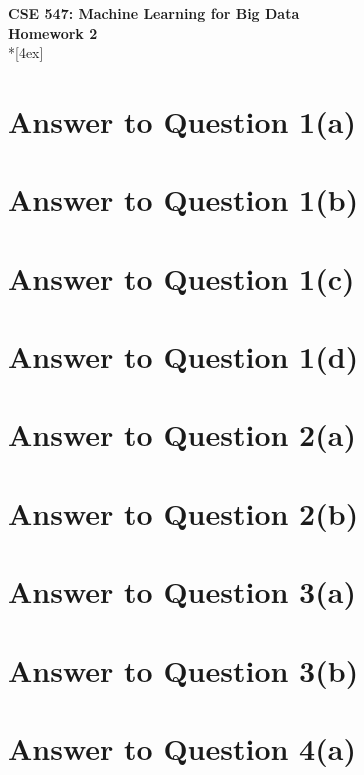 \documentclass[11pt]{article}
\begin{document}
\thispagestyle{empty}
\parindent 0pt
\vfill
\large

\begin{center}
\LARGE{\bf \textsf{CSE 547: Machine Learning for Big Data}}\\ {\bf \textsf{Homework 2}} 
\\*[4ex]
\end{center}

\section*{Answer to Question 1(a)}

\pagebreak[4]
\section*{Answer to Question 1(b)}

\pagebreak[4]
\section*{Answer to Question 1(c)}

\pagebreak[4]
\section*{Answer to Question 1(d)}

\pagebreak[4]
\section*{Answer to Question 2(a)}

\pagebreak[4]
\section*{Answer to Question 2(b)}

\pagebreak[4]
\section*{Answer to Question 3(a)}

\pagebreak[4]
\section*{Answer to Question 3(b)}

\pagebreak[4]
\section*{Answer to Question 4(a)}
\end{document}
